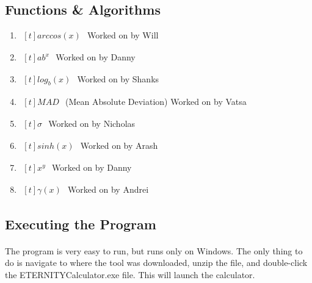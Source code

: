     \subsection{Functions \& Algorithms}
        \begin{enumerate}
            \item $\begin{aligned}[t]
                arccos(x)
            \end{aligned}$
                Worked on by Will
            \item $\begin{aligned}[t]
                ab^x
            \end{aligned}$
                Worked on by Danny
            \item $\begin{aligned}[t]
                log_{b}(x)
            \end{aligned}$
                Worked on by Shanks
            \item $\begin{aligned}[t]
                MAD
            \end{aligned}$
                (Mean Absolute Deviation) Worked on by Vatsa
            \item $\begin{aligned}[t]
                \sigma
            \end{aligned}$
                Worked on by Nicholas
            \item $\begin{aligned}[t]
                sinh(x)
            \end{aligned}$
                Worked on by Arash
            \item $\begin{aligned}[t]
                x^y
            \end{aligned}$
                Worked on by Danny
            \item $\begin{aligned}[t]
                \gamma(x)
            \end{aligned}$
                Worked on by Andrei
        \end{enumerate}

    \subsection{Executing the Program}
        \paragraph{}
        The program is very easy to run, but runs only on Windows. The only thing to do is navigate to where the tool was downloaded, unzip the file, and double-click the ETERNITYCalculator.exe file. This will launch the calculator.
